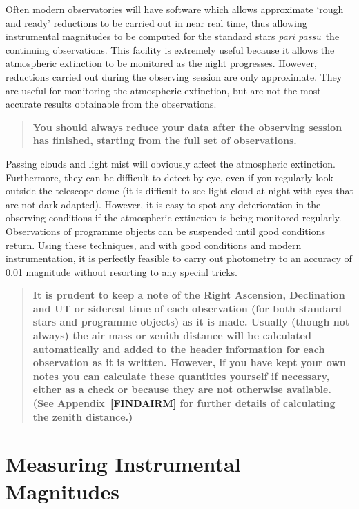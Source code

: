 \documentclass[twoside,11pt]{article}
\newcommand{\xlabel}[1]{}
\begin{document}
Often modern observatories will have software which allows approximate
`rough and ready' reductions to be carried out in near real time, thus
allowing instrumental magnitudes to be computed for the standard stars
{\it pari passu}\, the continuing observations.  This facility is extremely
useful because it allows the atmospheric extinction to be monitored as the
night progresses.  However, reductions carried out during the observing
session are only approximate.  They are useful for monitoring the
atmospheric extinction, but are not the most accurate results
obtainable from the observations.

\begin{quote}
{\bf You should always reduce your data after the observing session
has finished, starting from the full set of observations.}
\end{quote}

Passing clouds and light mist will obviously affect the atmospheric
extinction.  Furthermore, they can be difficult to detect by eye, even
if you regularly look outside the telescope dome (it is difficult to see
light cloud at night with eyes that are not dark-adapted).  However, it
is easy to spot any deterioration in the observing conditions if the
atmospheric extinction is being monitored regularly.  Observations of
programme objects can be suspended until good conditions return.  Using
these techniques, and with good conditions and modern instrumentation,
it is perfectly feasible to carry out photometry to an accuracy of 0.01
magnitude without resorting to any special tricks.

\begin{quote}
{\bf It is prudent to keep a note of the Right Ascension, Declination and
UT or sidereal time of each observation (for both standard stars and
programme objects) as it is made.  Usually (though not always) the air
mass or zenith distance will be calculated automatically and added to the
header information for each observation as it is written.  However, if you
have kept your own notes you can calculate these quantities yourself
if necessary, either as a check or because they are not otherwise
available. (See Appendix~\ref{FINDAIRM} for further details of
calculating the zenith distance.)}
\end{quote}


\section{\xlabel{MEASURE_INSTR}\label{MEASURE_INSTR}Measuring
Instrumental Magnitudes}
\end{document}
